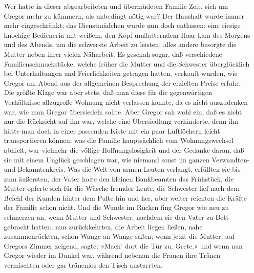 Wer hatte in dieser abgearbeiteten und übermüdeten Familie Zeit, sich um
Gregor mehr zu kümmern, als unbedingt nötig war? Der Haushalt wurde
immer mehr eingeschränkt; das Dienstmädchen wurde nun doch entlassen;
eine riesige knochige Bedienerin mit weißem, den Kopf umflatterndem Haar
kam des Morgens und des Abends, um die schwerste Arbeit zu leisten;
alles andere besorgte die Mutter neben ihrer vielen Näharbeit. Es
geschah sogar, daß verschiedene Familienschmuckstücke, welche früher die
Mutter und die Schwester überglücklich bei Unterhaltungen und
Feierlichkeiten getragen hatten, verkauft wurden, wie Gregor am Abend
aus der allgemeinen Besprechung der erzielten Preise erfuhr. Die größte
Klage war aber stets, daß man diese für die gegenwärtigen Verhältnisse
allzugroße Wohnung nicht verlassen konnte, da es nicht auszudenken war,
wie man Gregor übersiedeln sollte. Aber Gregor sah wohl ein, daß es
nicht nur die Rücksicht auf ihn war, welche eine Übersiedlung
verhinderte, denn ihn hätte man doch in einer passenden Kiste mit ein
paar Luftlöchern leicht transportieren können; was die Familie
hauptsächlich vom Wohnungswechsel abhielt, war vielmehr die völlige
Hoffnungslosigkeit und der Gedanke daran, daß sie mit einem Unglück
geschlagen war, wie niemand sonst im ganzen Verwandten- und
Bekanntenkreis. Was die Welt von armen Leuten verlangt, erfüllten sie
bis zum äußersten, der Vater holte den kleinen Bankbeamten das
Frühstück, die Mutter opferte sich für die Wäsche fremder Leute, die
Schwester lief nach dem Befehl der Kunden hinter dem Pulte hin und her,
aber weiter reichten die Kräfte der Familie schon nicht. Und die Wunde
im Rücken fing Gregor wie neu zu schmerzen an, wenn Mutter und
Schwester, nachdem sie den Vater zu Bett gebracht hatten, nun
zurückkehrten, die Arbeit liegen ließen, nahe zusammenrückten, schon
Wange an Wange saßen; wenn jetzt die Mutter, auf Gregors Zimmer zeigend,
sagte: »Mach' dort die Tür zu, Grete,« und wenn nun Gregor wieder im
Dunkel war, während nebenan die Frauen ihre Tränen vermischten oder gar
tränenlos den Tisch anstarrten.

